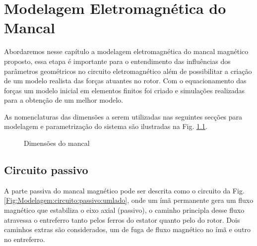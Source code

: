 \pagestyle{empty}
\cleardoublepage
\pagestyle{fancy}

\chapter{Modelagem Eletromagnética do Mancal}

%


Abordaremos nesse capítulo a modelagem eletromagnética do mancal magnético proposto, essa etapa é importante para o entendimento das influências dos parâmetros geométricos no circuito eletromagnético além de possibilitar a criação de um modelo realista das forças atuantes no rotor. Com o equacionamento das forças um modelo inicial em elementos finitos foi criado e simulações realizadas para a obtenção de um melhor modelo. 

As nomenclaturas das dimensões a serem utilizadas nas seguintes secções para modelagem e parametrização do sistema são ilustradas na Fig. \ref{Fig:Modelagem:Dimensoes}.




\begin{figure}[!ht]
	\centering
	\def\svgwidth{\columnwidth}
	
		\caption{Dimensões do mancal}
		\label{Fig:Modelagem:Dimensoes}
\end{figure} 

\section{Circuito passivo}

A parte passiva do mancal magnético pode ser descrita como o circuito da Fig. \ref{Fig:Modelagem:circuito:passivo:umlado}, onde um ímã permanente gera um fluxo magnético que estabiliza o eixo axial (passivo), o caminho principla desse fluxo atravessa o entreferro tanto pelos ferros do estator quanto pelo do rotor. Dois caminhos extras são considerados, um de fuga de fluxo magnético no ímã e outro no entreferro. 

